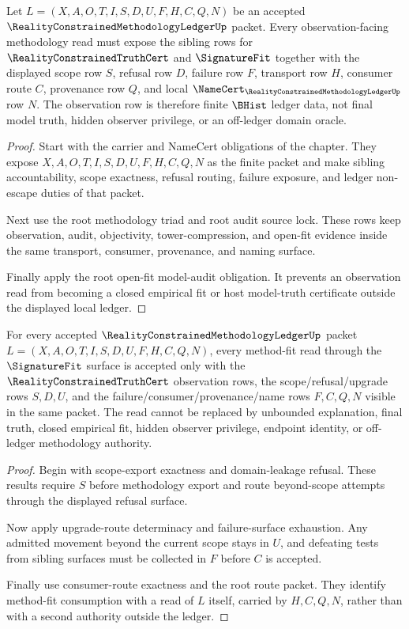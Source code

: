 \begin{theorem}
\label{thm:reality-constrained-methodology-ledger-observation-row}
Let $L=(X,A,O,T,I,S,D,U,F,H,C,Q,N)$ be an accepted
$\RealityConstrainedMethodologyLedgerUp$ packet. Every observation-facing
methodology read must expose the sibling rows for $\RealityConstrainedTruthCert$
and $\SignatureFit$ together with the displayed scope row $S$, refusal row $D$,
failure row $F$, transport row $H$, consumer route $C$, provenance row $Q$,
and local $\NameCert_{\RealityConstrainedMethodologyLedgerUp}$ row $N$. The
observation row is therefore finite $\BHist$ ledger data, not final model
truth, hidden observer privilege, or an off-ledger domain oracle.
\end{theorem}
\begin{proof}
Start with the carrier and NameCert obligations of the chapter. They expose
$X,A,O,T,I,S,D,U,F,H,C,Q,N$ as the finite packet and make sibling
accountability, scope exactness, refusal routing, failure exposure, and ledger
non-escape duties of that packet.

Next use the root methodology triad and root audit source lock. These rows
keep observation, audit, objectivity, tower-compression, and open-fit evidence
inside the same transport, consumer, provenance, and naming surface.

Finally apply the root open-fit model-audit obligation. It prevents an
observation read from becoming a closed empirical fit or host model-truth
certificate outside the displayed local ledger.
\end{proof}

\begin{theorem}
\label{thm:reality-constrained-methodology-ledger-method-fit-row}
For every accepted $\RealityConstrainedMethodologyLedgerUp$ packet
$L=(X,A,O,T,I,S,D,U,F,H,C,Q,N)$, every method-fit read through the
$\SignatureFit$ surface is accepted only with the $\RealityConstrainedTruthCert$
observation rows, the scope/refusal/upgrade rows $S,D,U$, and the
failure/consumer/provenance/name rows $F,C,Q,N$ visible in the same packet.
The read cannot be replaced by unbounded explanation, final truth, closed
empirical fit, hidden observer privilege, endpoint identity, or off-ledger
methodology authority.
\end{theorem}
\begin{proof}
Begin with scope-export exactness and domain-leakage refusal. These results
require $S$ before methodology export and route beyond-scope attempts through
the displayed refusal surface.

Now apply upgrade-route determinacy and failure-surface exhaustion. Any
admitted movement beyond the current scope stays in $U$, and defeating tests
from sibling surfaces must be collected in $F$ before $C$ is accepted.

Finally use consumer-route exactness and the root route packet. They identify
method-fit consumption with a read of $L$ itself, carried by $H,C,Q,N$, rather
than with a second authority outside the ledger.
\end{proof}

